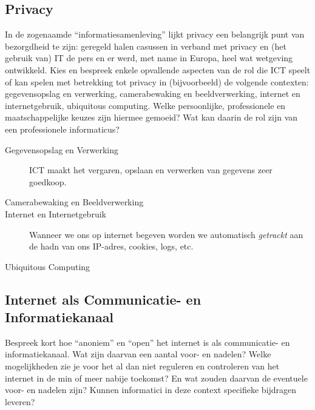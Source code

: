 \documentclass[../main.tex]{subfiles}
\begin{document}
\subsection{Privacy}
\begin{question}
In de zogenaamde ``informatiesamenleving'' lijkt privacy een belangrijk punt van bezorgdheid te zijn: geregeld halen casussen in verband met privacy en (het gebruik van) IT de pers en er werd, met name in Europa, heel wat wetgeving ontwikkeld.
Kies en bespreek enkele opvallende aspecten van de rol die ICT speelt of kan spelen met betrekking tot privacy in (bijvoorbeeld) de volgende contexten: gegevensopslag en verwerking, camerabewaking en beeldverwerking, internet en internetgebruik, ubiquitous computing. Welke persoonlijke, professionele en maatschappelijke keuzes zijn hiermee gemoeid? Wat kan daarin de rol zijn van een professionele informaticus?
\end{question}
\begin{solution}
\begin{description}
	\item[Gegevensopslag en Verwerking] ICT maakt het vergaren, opslaan en verwerken van gegevens zeer goedkoop.
	\item[Camerabewaking en Beeldverwerking]
	\item[Internet en Internetgebruik] Wanneer we ons op internet begeven worden we automatisch \emph{getrackt} aan de hadn van ons IP-adres, cookies, logs, etc.
	\item[Ubiquitous Computing]
\end{description}
\end{solution}

\subsection{Internet als Communicatie- en Informatiekanaal}
\begin{question}
Bespreek kort hoe ``anoniem'' en ``open'' het internet is als communicatie- en informatiekanaal. Wat zijn daarvan een aantal voor- en nadelen? Welke mogelijkheden zie je voor het al dan niet reguleren en controleren van het internet in de min of meer nabije toekomst? En wat zouden daarvan de eventuele voor- en nadelen zijn? Kunnen informatici in deze context specifieke bijdragen leveren?
\end{question}
\end{document}
